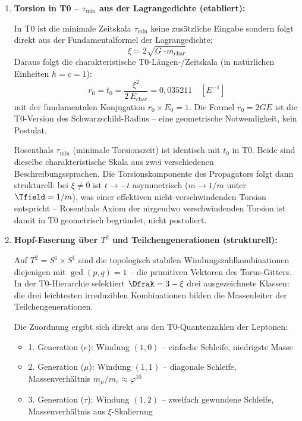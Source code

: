 \begin{enumerate}

  \item \textbf{Torsion in T0 -- $\tau_{\min}$ aus der Lagrangedichte (etabliert):}

  In T0 ist die minimale Zeitskala $\tau_{\min}$ keine zusätzliche Eingabe sondern folgt direkt aus der Fundamentalformel der Lagrangedichte:
  \begin{equation}
    \xi = 2\sqrt{G \cdot m_{\text{char}}}
  \end{equation}
  Daraus folgt die charakteristische T0-Längen-/Zeitskala (in natürlichen Einheiten $\hbar = c = 1$):
  \begin{equation}
    r_0 = t_0 = \frac{\xi^2}{2\,E_{\text{char}}} = 0{,}035211 \quad [E^{-1}]
  \end{equation}
  mit der fundamentalen Konjugation $r_0 \times E_0 = 1$. Die Formel $r_0 = 2GE$ ist die T0-Version des Schwarzschild-Radius -- eine geometrische Notwendigkeit, kein Postulat.

  Rosenthals $\tau_{\min}$ (minimale Torsionszeit) ist identisch mit $t_0$ in T0. Beide sind dieselbe charakteristische Skala aus zwei verschiedenen Beschreibungssprachen. Die Torsionskomponente des Propagators folgt dann strukturell: bei $\xi \neq 0$ ist $t \to -t$ asymmetrisch ($m \to 1/m$ unter $\Tfield = 1/m$), was einer effektiven nicht-verschwindenden Torsion entspricht -- Rosenthals Axiom der nirgendwo verschwindenden Torsion ist damit in T0 geometrisch begründet, nicht postuliert.

  \item \textbf{Hopf-Faserung über $T^2$ und Teilchengenerationen (strukturell):}

  Auf $T^2 = S^1 \times S^1$ sind die topologisch stabilen Windungszahlkombinationen diejenigen mit $\gcd(p,q) = 1$ -- die primitiven Vektoren des Torus-Gitters. In der T0-Hierarchie selektiert $\Dfrak = 3 - \xi$ drei ausgezeichnete Klassen: die drei leichtesten irreduziblen Kombinationen bilden die Massenleiter der Teilchengenerationen.

  Die Zuordnung ergibt sich direkt aus den T0-Quantenzahlen der Leptonen:
  \begin{itemize}[noitemsep]
    \item 1. Generation ($e$): Windung $(1,0)$ -- einfache Schleife, niedrigste Masse
    \item 2. Generation ($\mu$): Windung $(1,1)$ -- diagonale Schleife, Massenverhältnis $m_\mu/m_e \approx \varphi^{10}$
    \item 3. Generation ($\tau$): Windung $(1,2)$ -- zweifach gewundene Schleife, Massenverhältnis aus $\xi$-Skalierung
  \end{itemize}


\end{enumerate}

